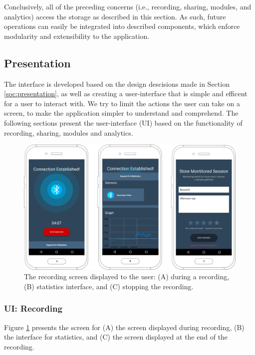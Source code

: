Conclusively, all of the preceding concerns (i.e., recording, sharing, modules, and analytics) access the storage as described in this section. As such, future operations can easily be integrated into described components, which enforce modularity and extensibility to the application.

\subsection{Presentation}\label{ioc:presentation}
The interface is developed based on the design descisions made in Section \ref{soc:presentation}, as well as creating a user-interface that is simple and efficent for a user to interact with. We try to limit the actions the user can take on a screen, to make the application simpler to understand and comprehend. The following sections present the user-interface (UI) based on the functionality of recording, sharing, modules and analytics. 

\begin{figure}[!h]
    \centering
    \includegraphics[scale=0.26]{images/Recording_img.pdf}
    \caption{The recording screen displayed to the user: (A) during a recording, (B) statistics interface, and (C) stopping the recording.}
    \label{fig:screen_recording}
\end{figure}

\subsubsection{UI: Recording}

Figure \ref{fig:screen_recording} presents the screen for (A) the screen displayed during recording, (B) the interface for statistics, and (C) the screen displayed at the end of the recording. 

